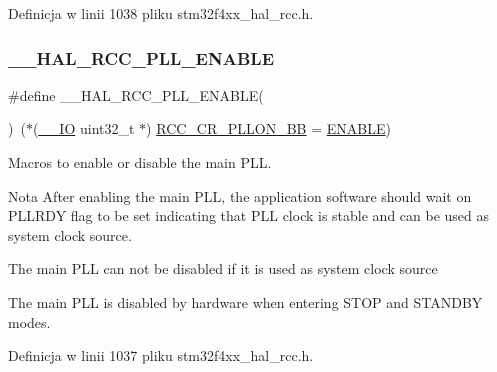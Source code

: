 Definicja w linii 1038 pliku stm32f4xx\+\_\+hal\+\_\+rcc.\+h.

\mbox{\label{group___r_c_c___p_l_l___configuration_gaaf196a2df41b0bcbc32745c2b218e696}} 
\subsubsection{\texorpdfstring{\+\_\+\+\_\+\+H\+A\+L\+\_\+\+R\+C\+C\+\_\+\+P\+L\+L\+\_\+\+E\+N\+A\+B\+LE}{\_\_HAL\_RCC\_PLL\_ENABLE}}
{\footnotesize\ttfamily \#define \+\_\+\+\_\+\+H\+A\+L\+\_\+\+R\+C\+C\+\_\+\+P\+L\+L\+\_\+\+E\+N\+A\+B\+LE(\begin{DoxyParamCaption}{ }\end{DoxyParamCaption})~($\ast$(\hyperlink{core__sc300_8h_aec43007d9998a0a0e01faede4133d6be}{\+\_\+\+\_\+\+IO} uint32\+\_\+t $\ast$) \hyperlink{group___r_c_c___bit_address___alias_region_ga0b0a8f171b66cc0d767716ba23ad3c6f}{R\+C\+C\+\_\+\+C\+R\+\_\+\+P\+L\+L\+O\+N\+\_\+\+BB} = \hyperlink{group___exported__types_ggac9a7e9a35d2513ec15c3b537aaa4fba1a7d46875fa3ebd2c34d2756950eda83bf}{E\+N\+A\+B\+LE})}



Macros to enable or disable the main P\+LL. 

\begin{DoxyNote}{Nota}
After enabling the main P\+LL, the application software should wait on P\+L\+L\+R\+DY flag to be set indicating that P\+LL clock is stable and can be used as system clock source. 

The main P\+LL can not be disabled if it is used as system clock source 

The main P\+LL is disabled by hardware when entering S\+T\+OP and S\+T\+A\+N\+D\+BY modes. 
\end{DoxyNote}


Definicja w linii 1037 pliku stm32f4xx\+\_\+hal\+\_\+rcc.\+h.

\mbox{\label{group___r_c_c___p_l_l___configuration_gabca62f581e6c2553cca7ef0d7a2a4b7f}} 

